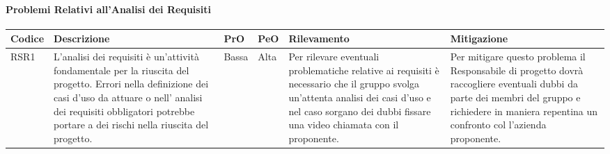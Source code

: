 \paragraph{Problemi Relativi all'Analisi dei Requisiti}
\begin{center}

	\begin{longtable}{p{1cm}|p{4cm}|p{0.7cm}|p{0.7cm}|p{3cm}|p{4cm}}
		\arrayrulecolor{white}
		\hline
		\rowcolor{blue!20}
		\textbf{Codice} & 
		\textbf{Descrizione} &
		\textbf{PrO}  &
		\textbf{PeO}  &				        
		\textbf{Rilevamento} &
		\textbf{Mitigazione} \\
		\hline	
		RSR1 & L'analisi dei requisiti è un'attività fondamentale per la riuscita del progetto.  Errori nella definizione dei casi d'uso da attuare o nell' analisi dei requisiti obbligatori potrebbe portare a dei rischi nella riuscita del progetto. & Bassa & Alta & Per rilevare eventuali problematiche relative ai requisiti è necessario che il gruppo svolga un'attenta analisi dei casi d'uso e nel caso sorgano dei dubbi fissare una video chiamata con il proponente. & Per mitigare questo problema il Responsabile di progetto dovrà raccogliere eventuali dubbi da parte dei membri del gruppo e richiedere in maniera repentina un confronto col l'azienda proponente. \\
	\end{longtable}
\end{center}